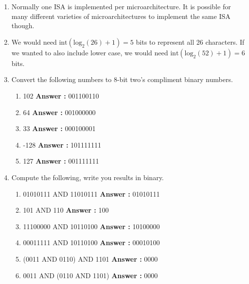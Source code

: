 \documentclass[a4paper,11pt]{article}
\begin{document}
\begin{enumerate}
\item Normally one ISA is implemented per microarchitecture. It is possible for many different varieties of microarchitectures to implement the same ISA though.

\item We would need $\text{int}(\text{log}_2(26)+1) = 5$ bits to represent all 26 characters. If we wanted to also include lower case, we would need $\text{int}(\text{log}_2(52)+1) = 6$ bits. 

\item Convert the following numbers to 8-bit two's compliment binary numbers.
  \begin{enumerate}
  \item 102  \textbf{Answer :} 001100110

  \item 64  \textbf{Answer :} 001000000

  \item 33  \textbf{Answer :} 000100001

  \item -128  \textbf{Answer :} 101111111

  \item 127 \textbf{Answer :} 001111111
  \end{enumerate}

\item Compute the following, write you results in binary.

  \begin{enumerate}
  \item 01010111 AND 11010111 \textbf{Answer :} 01010111
  \item 101 AND 110 \textbf{Answer :} 100
  \item 11100000 AND 10110100 \textbf{Answer :} 10100000
  \item 00011111 AND 10110100 \textbf{Answer :} 00010100
  \item (0011 AND 0110) AND 1101 \textbf{Answer :} 0000 
  \item 0011 AND (0110 AND 1101) \textbf{Answer :} 0000
  \end{enumerate}


\end{enumerate}
\end{document}
